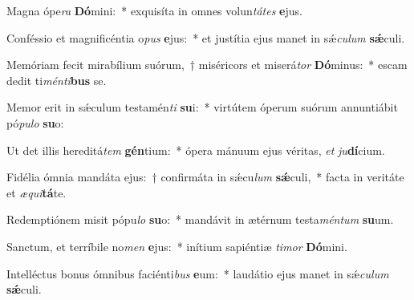 \item Magna ópe\textit{ra} \textbf{Dó}mini:~* exquisíta in omnes volun\textit{tá}\textit{tes} \textbf{e}jus.
\item Conféssio et magnificéntia o\textit{pus} \textbf{e}jus:~* et justítia ejus manet in sǽ\textit{cu}\textit{lum} \textbf{sǽ}culi.
\item Memóriam fecit mirabílium suórum,~† miséricors et miserá\textit{tor} \textbf{Dó}minus:~* escam dedit ti\textit{mén}\textit{ti}\textbf{bus} se.
\item Memor erit in sǽculum testamén\textit{ti} \textbf{su}i:~* virtútem óperum suórum annuntiábit pó\textit{pu}\textit{lo} \textbf{su}o:
\item Ut det illis hereditá\textit{tem} \textbf{gén}tium:~* ópera mánuum ejus véritas, \textit{et} \textit{ju}\textbf{dí}cium.
\item Fidélia ómnia mandáta ejus:~† confirmáta in sǽcu\textit{lum} \textbf{sǽ}culi,~* facta in veritáte et \textit{æ}\textit{qui}\textbf{tá}te.
\item Redemptiónem misit pópu\textit{lo} \textbf{su}o:~* mandávit in ætérnum testa\textit{mén}\textit{tum} \textbf{su}um.
\item Sanctum, et terríbile no\textit{men} \textbf{e}jus:~* inítium sapiéntiæ \textit{ti}\textit{mor} \textbf{Dó}mini.
\item Intelléctus bonus ómnibus faciénti\textit{bus} \textbf{e}um:~* laudátio ejus manet in sǽ\textit{cu}\textit{lum} \textbf{sǽ}culi.
